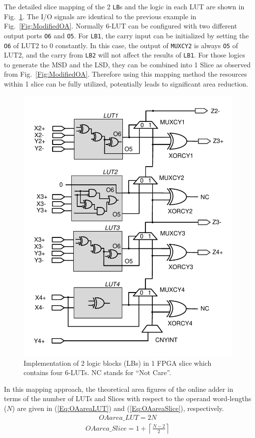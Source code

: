 \documentclass[conference]{IEEEtran}
\begin{document}
The detailed slice mapping of the 2 \texttt{LB}s and the logic in each LUT are shown in Fig.~\ref{Fig:SliceNew}. The I/O signals are identical to the previous example in Fig.~\ref{Fig:ModifiedOA}. Normally 6-LUT can be configured with two different output ports \texttt{O6} and \texttt{O5}. For \texttt{LB1}, the carry input can be initialized by setting the \texttt{O6} of LUT2 to 0 constantly. In this case, the output of \texttt{MUXCY2} is always \texttt{O5} of LUT2, and the carry from \texttt{LB2} will not affect the results of \texttt{LB1}. For those logics to generate the MSD and the LSD, they can be combined into 1 Slice as observed from Fig.~\ref{Fig:ModifiedOA}. Therefore using this mapping method the resources within 1 slice can be fully utilized, potentially leads to significant area reduction.

\begin{figure}[tbp]
	\centering
	\includegraphics[width=.5\textwidth]{./Figures/SDadder_FastCarry_New.pdf}
	\caption{Implementation of 2 logic blocks (LBs) in 1 FPGA slice which contains four 6-LUTs. NC stands for ``Not Care''.}
	\label{Fig:SliceNew}
\end{figure}

In this mapping approach, the theoretical area figures of the online adder in terms of the number of LUTs and Slices with respect to the operand word-lengths ($N$) are given in (\ref{Eq:OAareaLUT}) and (\ref{Eq:OAareaSlice}), respectively.
\begin{eqnarray}\label{Eq:OAareaLUT}
	OAarea\_LUT = 2N
\end{eqnarray}
%
\begin{eqnarray}\label{Eq:OAareaSlice}
	OAarea\_Slice = 1+\left\lceil\frac{N-2}{2}\right\rceil
\end{eqnarray}
\end{document}
